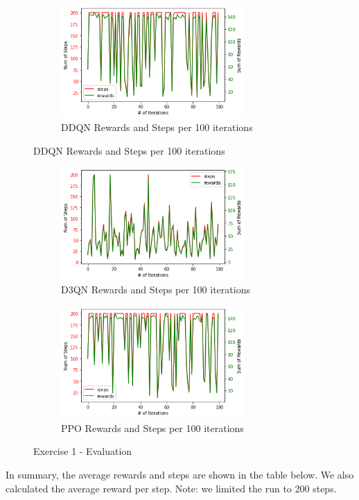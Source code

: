 \documentclass[leqno]{article}
\begin{document}
\begin{multicols}{2}
\begin{figure}[H]
\centering
  \begin{subfigure}{8cm}
    \centering\includegraphics[width=7cm]{figs/ddqn_ex1_100_iters.png}
    \caption{DDQN Rewards and Steps per 100 iterations}
  \end{subfigure}
\end{figure}%
\begin{figure}[H]\ContinuedFloat
  \begin{subfigure}{8cm}
    \centering\includegraphics[width=7cm]{figs/d3qn_ex1_100_iters.png}
    \caption{D3QN Rewards and Steps per 100 iterations}
  \end{subfigure}
  \begin{subfigure}{8cm}
    \centering\includegraphics[width=7cm]{figs/ppo_ex1_100_iters.png}
    \caption{PPO Rewards and Steps per 100 iterations}
  \end{subfigure}
  \caption{Exercise 1 - Evaluation}
\end{figure}


In summary, the average rewards and steps are shown in the table below. We also calculated the average reward per step. Note: we limited the run to 200 steps.


\end{multicols}
\end{document}

